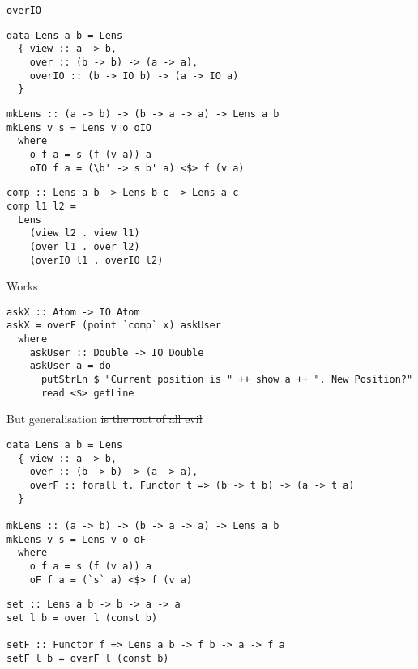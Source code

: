 \documentclass[presentation,aspectratio=169,8pt]{beamer}
\begin{document}
\begin{frame}[label={sec:org72be128},fragile]{\texttt{overIO}}
 \begin{verbatim}
data Lens a b = Lens
  { view :: a -> b,
    over :: (b -> b) -> (a -> a),
    overIO :: (b -> IO b) -> (a -> IO a)
  }
\end{verbatim}

\pause

\begin{verbatim}
mkLens :: (a -> b) -> (b -> a -> a) -> Lens a b
mkLens v s = Lens v o oIO
  where
    o f a = s (f (v a)) a
    oIO f a = (\b' -> s b' a) <$> f (v a)
\end{verbatim}

\pause

\begin{verbatim}
comp :: Lens a b -> Lens b c -> Lens a c
comp l1 l2 =
  Lens
    (view l2 . view l1)
    (over l1 . over l2)
    (overIO l1 . overIO l2)
\end{verbatim}
\end{frame}

\begin{frame}[label={sec:org5b9203f},fragile]{Works}
 \begin{verbatim}
askX :: Atom -> IO Atom
askX = overF (point `comp` x) askUser
  where
    askUser :: Double -> IO Double
    askUser a = do
      putStrLn $ "Current position is " ++ show a ++ ". New Position?"
      read <$> getLine
\end{verbatim}
\end{frame}

\begin{frame}[label={sec:org157b873},fragile]{But generalisation \sout{is the root of all evil}}
 \begin{verbatim}
data Lens a b = Lens
  { view :: a -> b,
    over :: (b -> b) -> (a -> a),
    overF :: forall t. Functor t => (b -> t b) -> (a -> t a)
  }

mkLens :: (a -> b) -> (b -> a -> a) -> Lens a b
mkLens v s = Lens v o oF
  where
    o f a = s (f (v a)) a
    oF f a = (`s` a) <$> f (v a)
\end{verbatim}

\pause

\begin{verbatim}
set :: Lens a b -> b -> a -> a
set l b = over l (const b)

setF :: Functor f => Lens a b -> f b -> a -> f a
setF l b = overF l (const b)
\end{verbatim}
\end{frame}
\end{document}
